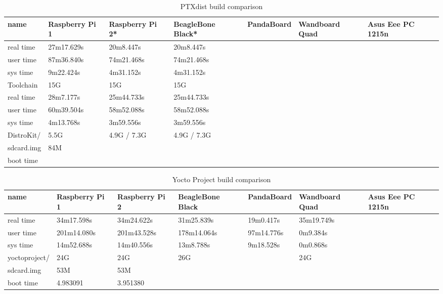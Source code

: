 \documentclass[printmode]{mgr}
\begin{document}
\begin{landscape}
\begin{table}
  \begin{tabular}{| p{2.5cm} | p{3cm} | p{3cm} | p{3cm} | p{3cm} | p{3cm} | p{3cm} |}
    \hline
    name & Raspberry Pi 1 & Raspberry Pi 2* & BeagleBone Black* & PandaBoard & Wandboard Quad & Asus Eee PC 1215n \\
    \hline
    real time & 27m17.629s & 20m8.447s & 20m8.447s &  &  &  \\
    \hline
    user time & 87m36.840s & 74m21.468s & 74m21.468s &  &  &  \\
    \hline
    sys time & 9m22.424s & 4m31.152s & 4m31.152s &  &  &  \\
    \hline
    Toolchain & 15G & 15G & 15G &  &  &  \\
    \hline
    real time & 28m7.177s & 25m44.733s & 25m44.733s &  &  &  \\
    \hline
    user time & 60m39.504s & 58m52.088s & 58m52.088s &  &  &  \\
    \hline
    sys time & 4m13.768s & 3m59.556s & 3m59.556s &  &  &  \\
    \hline
    DistroKit/ & 5.5G & 4.9G / 7.3G & 4.9G / 7.3G &  &  &  \\
    \hline
    sdcard.img & 84M &  &  &  &  &  \\
    \hline
    boot time &  &  &  &  &  &  \\
    \hline
  \end{tabular}
  \caption{PTXdist build comparison}
\end{table}




\begin{table}
  \begin{tabular}{| p{2.5cm} | p{3cm} | p{3cm} | p{3cm} | p{3cm} | p{3cm} | p{3cm} |}
    \hline
    name & Raspberry Pi 1 & Raspberry Pi 2 & BeagleBone Black & PandaBoard & Wandboard Quad & Asus Eee PC 1215n \\
    \hline
    real time & 34m17.598s & 34m24.622s & 31m25.839s & 19m0.417s & 35m19.749s &  \\
    \hline
    user time & 201m14.080s & 201m43.528s & 178m14.064s & 97m14.776s & 0m9.384s &  \\
    \hline
    sys time & 14m52.688s & 14m40.556s & 13m8.788s & 9m18.528s & 0m0.868s &  \\
    \hline
    yoctoproject/ & 24G & 24G & 26G &  & 24G &  \\
    \hline
    sdcard.img & 53M & 53M &  &  &  &  \\
    \hline
    boot time & 4.983091 & 3.951380 &  &  &  &  \\
    \hline
  \end{tabular}
  \caption{Yocto Project build comparison}
\end{table}


\end{landscape}
\end{document}
